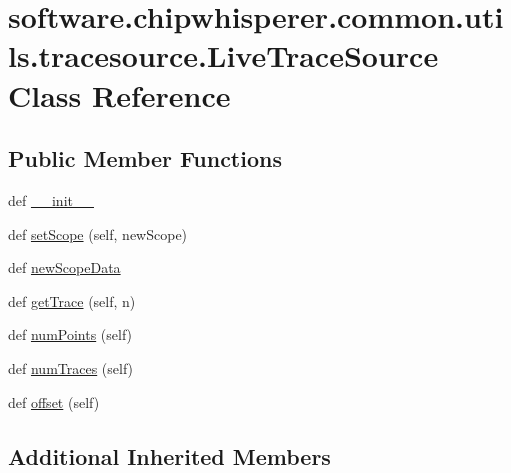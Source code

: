 \hypertarget{classsoftware_1_1chipwhisperer_1_1common_1_1utils_1_1tracesource_1_1LiveTraceSource}{}\section{software.\+chipwhisperer.\+common.\+utils.\+tracesource.\+Live\+Trace\+Source Class Reference}
\label{classsoftware_1_1chipwhisperer_1_1common_1_1utils_1_1tracesource_1_1LiveTraceSource}
\subsection*{Public Member Functions}
\begin{DoxyCompactItemize}
\item 
def \hyperlink{classsoftware_1_1chipwhisperer_1_1common_1_1utils_1_1tracesource_1_1LiveTraceSource_ab9a204343381bc0dfedbfeea8a053715}{\+\_\+\+\_\+init\+\_\+\+\_\+}
\item 
def \hyperlink{classsoftware_1_1chipwhisperer_1_1common_1_1utils_1_1tracesource_1_1LiveTraceSource_a8530d7d44e220140a0b226c1f4ebc00d}{set\+Scope} (self, new\+Scope)
\item 
def \hyperlink{classsoftware_1_1chipwhisperer_1_1common_1_1utils_1_1tracesource_1_1LiveTraceSource_a34883c8896eecdf659f3de2da98421b6}{new\+Scope\+Data}
\item 
def \hyperlink{classsoftware_1_1chipwhisperer_1_1common_1_1utils_1_1tracesource_1_1LiveTraceSource_a3d7dfb1a5572d335cab26873ba7f97dd}{get\+Trace} (self, n)
\item 
def \hyperlink{classsoftware_1_1chipwhisperer_1_1common_1_1utils_1_1tracesource_1_1LiveTraceSource_a5ad9ac06f0b1d7d87a20eb8bf1ebd63e}{num\+Points} (self)
\item 
def \hyperlink{classsoftware_1_1chipwhisperer_1_1common_1_1utils_1_1tracesource_1_1LiveTraceSource_aa67ed25f19ccb88b8fbb77ef2be16102}{num\+Traces} (self)
\item 
def \hyperlink{classsoftware_1_1chipwhisperer_1_1common_1_1utils_1_1tracesource_1_1LiveTraceSource_a5006ad6a8213c9831a9ece5d65ac7331}{offset} (self)
\end{DoxyCompactItemize}
\subsection*{Additional Inherited Members}


